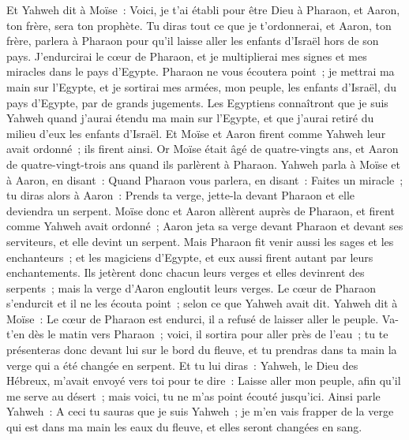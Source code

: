 \begin{multicols}{2}
\VerseOne{}Et Yahweh dit à Moïse~: Voici, je t'ai établi pour être Dieu à Pharaon, et Aaron, ton frère, sera ton prophète.
Tu diras tout ce que je t'ordonnerai, et Aaron, ton frère, parlera à Pharaon pour qu'il laisse aller les enfants d'Israël hors de son pays.
J'endurcirai le cœur de Pharaon, et je multiplierai mes signes et mes miracles dans le pays d'Egypte.
Pharaon ne vous écoutera point~; je mettrai ma main sur l'Egypte, et je sortirai mes armées, mon peuple, les enfants d'Israël, du pays d'Egypte, par de grands jugements.
Les Egyptiens connaîtront que je suis Yahweh quand j'aurai étendu ma main sur l'Egypte, et que j'aurai retiré du milieu d'eux les enfants d'Israël.
Et Moïse et Aaron firent comme Yahweh leur avait ordonné~; ils firent ainsi.
Or Moïse était âgé de quatre-vingts ans, et Aaron de quatre-vingt-trois ans quand ils parlèrent à Pharaon.
Yahweh parla à Moïse et à Aaron, en disant~:
Quand Pharaon vous parlera, en disant~: Faites un miracle~; tu diras alors à Aaron~: Prends ta verge, jette-la devant Pharaon et elle deviendra un serpent.
Moïse donc et Aaron allèrent auprès de Pharaon, et firent comme Yahweh avait ordonné~; Aaron jeta sa verge devant Pharaon et devant ses serviteurs, et elle devint un serpent.
Mais Pharaon fit venir aussi les sages et les enchanteurs~; et les magiciens d'Egypte, et eux aussi firent autant par leurs enchantements.
Ils jetèrent donc chacun leurs verges et elles devinrent des serpents~; mais la verge d'Aaron engloutit leurs verges.
Le cœur de Pharaon s'endurcit et il ne les écouta point~; selon ce que Yahweh avait dit.
Yahweh dit à Moïse~: Le cœur de Pharaon est endurci, il a refusé de laisser aller le peuple.
Va-t'en dès le matin vers Pharaon~; voici, il sortira pour aller près de l'eau~; tu te présenteras donc devant lui sur le bord du fleuve, et tu prendras dans ta main la verge qui a été changée en serpent.
Et tu lui diras~: Yahweh, le Dieu des Hébreux, m'avait envoyé vers toi pour te dire~: Laisse aller mon peuple, afin qu'il me serve au désert~; mais voici, tu ne m'as point écouté jusqu'ici.
Ainsi parle Yahweh~: A ceci tu sauras que je suis Yahweh~; je m'en vais frapper de la verge qui est dans ma main les eaux du fleuve, et elles seront changées en sang.

\end{multicols}
